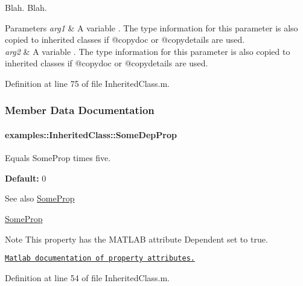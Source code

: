  Blah. Blah.


\begin{DoxyParams}{Parameters}
{\em arg1} & A variable . The type information for this parameter is also copied to inherited classes if @copydoc or @copydetails are used. \\
\hline
{\em arg2} & A variable . The type information for this parameter is also copied to inherited classes if @copydoc or @copydetails are used.  \\
\hline
\end{DoxyParams}


Definition at line 75 of file Inherited\+Class.\+m.



\subsubsection{Member Data Documentation}
\hypertarget{classexamples_1_1_inherited_class_a950c8344cf4fa29cc37e77078c023ecd}{}
\paragraph[{Some\+Dep\+Prop}]{\setlength{\rightskip}{0pt plus 5cm}examples\+::\+Inherited\+Class\+::\+Some\+Dep\+Prop}\label{classexamples_1_1_inherited_class_a950c8344cf4fa29cc37e77078c023ecd}
Equals Some\+Prop times five.

{\bfseries Default\+:} 0

\begin{DoxySeeAlso}{See also}
\hyperlink{classexamples_1_1_inherited_class_ab3defe2367efa7a39a89d2cb8c8f5047}{Some\+Prop} 

\hyperlink{classexamples_1_1_inherited_class_ab3defe2367efa7a39a89d2cb8c8f5047}{Some\+Prop}
\end{DoxySeeAlso}
\begin{DoxyNote}{Note}
This property has the M\+A\+T\+L\+A\+B attribute {\ttfamily Dependent} set to true. 

\href{http://www.mathworks.de/help/techdoc/matlab_oop/brjjwby.html}{\tt Matlab documentation of property attributes.} 
\end{DoxyNote}


Definition at line 54 of file Inherited\+Class.\+m.

\hypertarget{classexamples_1_1_inherited_class_ab3defe2367efa7a39a89d2cb8c8f5047}{}
